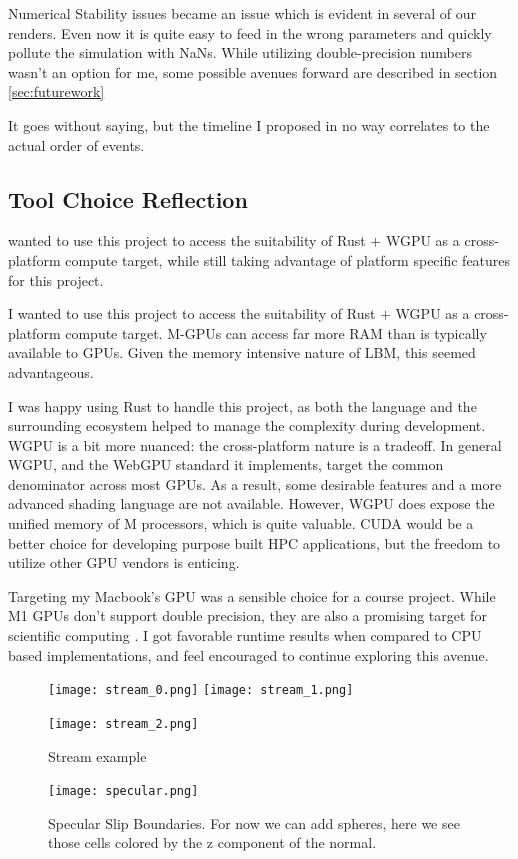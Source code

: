 Numerical Stability issues became an issue which
is evident in several of our renders.
Even now it is quite easy to feed in the wrong parameters
and quickly pollute the simulation with NaNs.
While utilizing double-precision numbers wasn't an option for me,
some possible avenues forward are described 
in section \ref{sec:futurework}

It goes without saying, 
but the timeline I proposed 
in no way correlates to the actual order of events.

\subsection{Tool Choice Reflection}
 wanted to use this project to access the suitability of Rust $+$ WGPU 
as a cross-platform compute target, 
while still taking advantage of platform specific features 
for this project.




I wanted to use this project to access the suitability of Rust $+$ WGPU 
as a cross-platform compute target.
M-GPUs can access far more RAM than is typically available to GPUs.
Given the memory intensive nature of LBM, this seemed advantageous.

I was happy using Rust to handle this project, as both the 
language and the surrounding ecosystem helped to manage
the complexity during development.
WGPU is a bit more nuanced: the cross-platform nature
is a tradeoff. In general WGPU, 
and the WebGPU standard it implements,
target the common denominator across most GPUs.
As a result, some desirable features and a more advanced
shading language are not available.
However, WGPU does expose the unified memory of M processors,
which is quite valuable.
CUDA would be a better choice 
for developing purpose built HPC
applications, but the freedom to utilize other GPU vendors is enticing.

Targeting my Macbook's GPU was a sensible choice for a course project.
While M1 GPUs don't support double precision, 
they are also a promising target for scientific computing \cite{Kenyon2022}.
I got favorable runtime results when compared to CPU based implementations,
and feel encouraged to continue exploring this avenue.

\begin{figure}
  \begin{center}
    \texttt{[image: stream\_0.png]}
    \texttt{[image: stream\_1.png]}

    \texttt{[image: stream\_2.png]}
  \end{center}
  \caption{Stream example}
\end{figure}

\begin{figure}
  \begin{center}
    \texttt{[image: specular.png]}
  \end{center}
  \caption{Specular Slip Boundaries.
For now we can add spheres, here we see those cells colored by the z component of the normal.}
\end{figure}
